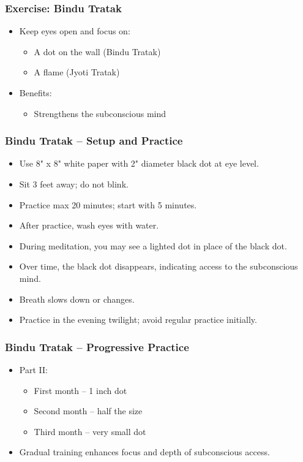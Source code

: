 \begin{frame}[fragile]\frametitle{Exercise: Bindu Tratak}
    \begin{itemize}
        \item Keep eyes open and focus on:
        \begin{itemize}
            \item A dot on the wall (Bindu Tratak)
            \item A flame (Jyoti Tratak)
        \end{itemize}
        \item Benefits:
        \begin{itemize}
            \item Strengthens the subconscious mind
        \end{itemize}
    \end{itemize}
\end{frame}

\begin{frame}[fragile]\frametitle{Bindu Tratak – Setup and Practice}
    \begin{itemize}
        \item Use 8" x 8" white paper with 2" diameter black dot at eye level.
        \item Sit 3 feet away; do not blink.
        \item Practice max 20 minutes; start with 5 minutes.
        \item After practice, wash eyes with water.
        \item During meditation, you may see a lighted dot in place of the black dot.
        \item Over time, the black dot disappears, indicating access to the subconscious mind.
        \item Breath slows down or changes.
        \item Practice in the evening twilight; avoid regular practice initially.
    \end{itemize}
\end{frame}

\begin{frame}[fragile]\frametitle{Bindu Tratak – Progressive Practice}
    \begin{itemize}
        \item Part II:
        \begin{itemize}
            \item First month – 1 inch dot
            \item Second month – half the size
            \item Third month – very small dot
        \end{itemize}
        \item Gradual training enhances focus and depth of subconscious access.
    \end{itemize}
\end{frame}

